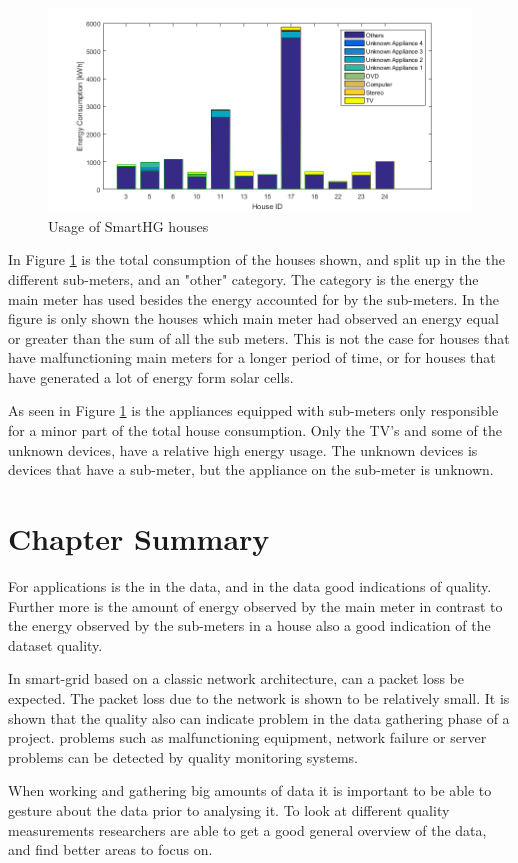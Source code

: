 \begin{figure}[H]
\centering
\includegraphics[width=1\textwidth]{billeder/SHGHouseUsagesV2.png}
\caption{Usage of SmartHG houses}
\label{fig:USAGEofSHG}
\end{figure}

In Figure \ref{fig:USAGEofSHG} is the total consumption of the houses shown, and split up in the the different sub-meters, and an "other" category. The  category is the energy the main meter has used besides the energy accounted for by the sub-meters. In the figure is only shown the houses which main meter had observed an energy equal or greater than the sum of all the sub meters. This is not the case for houses that have malfunctioning main meters for a longer period of time, or for houses that have generated a lot of energy form solar cells. 

As seen in Figure \ref{fig:USAGEofSHG} is the appliances equipped with sub-meters only responsible for a minor part of the total house consumption. Only the TV's and some of the unknown devices, have a relative high energy usage. The unknown devices is devices that have a sub-meter, but the appliance on the sub-meter is unknown.  

\section{Chapter Summary}
For  applications is the  in the data, and  in the data good indications of quality. Further more is the amount of energy observed by the main meter in contrast to the energy observed by the sub-meters in a house also a good indication of the dataset quality. 

In smart-grid based on a classic  network architecture, can a packet loss be expected. The packet loss due to the network is shown to be relatively small. It is shown that the quality also can indicate problem in the data gathering phase of a project. problems such as malfunctioning equipment, network failure or server problems can be detected by quality monitoring systems.  

When working and gathering big amounts of data it is important to be able to gesture about the data prior to analysing it. To look at different quality measurements researchers are able to get a good general overview of the data, and find better areas to focus on. 

